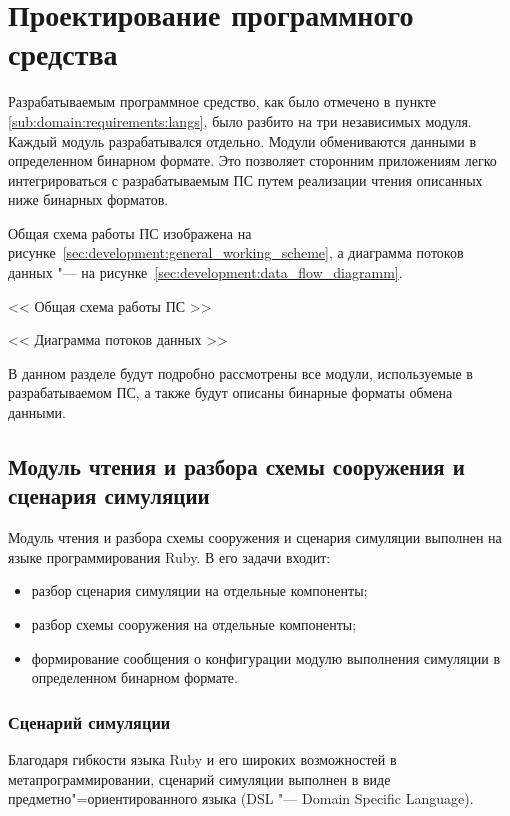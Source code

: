 \section{Проектирование программного средства} %
\label{sec:development}

Разрабатываемым программное средство, как было отмечено в пункте \ref{sub:domain:requirements:langs}, было разбито на три независимых модуля.
Каждый модуль разрабатывался отдельно. Модули обмениваются данными в определенном бинарном формате.
Это позволяет сторонним приложениям легко интегрироваться с разрабатываемым ПС путем реализации чтения описанных ниже бинарных форматов.

Общая схема работы ПС изображена на рисунке~\ref{sec:development:general_working_scheme}, а диаграмма потоков данных "--- на рисунке~\ref{sec:development:data_flow_diagramm}.

<< Общая схема работы ПС >>

<< Диаграмма потоков данных >>

В данном разделе будут подробно рассмотрены все модули, используемые в разрабатываемом ПС, а также будут описаны бинарные форматы обмена данными.

\subsection{Модуль чтения и разбора схемы сооружения и сценария симуляции}
\label{sec:development:preprocessor}

Модуль чтения и разбора схемы сооружения и сценария симуляции выполнен на языке программирования Ruby.
В его задачи входит:
\begin{itemize}
  \item разбор сценария симуляции на отдельные компоненты;
  \item разбор схемы сооружения на отдельные компоненты;
  \item формирование сообщения о конфигурации модулю выполнения симуляции в определенном бинарном формате.
\end{itemize}

\subsubsection{Сценарий симуляции}
\label{sec:development:preprocessor:scenario_dsl}

Благодаря гибкости языка Ruby и его широких возможностей в метапрограммировании,
сценарий симуляции выполнен в виде предметно"=ориентированного языка (DSL "--- Domain Specific Language).


